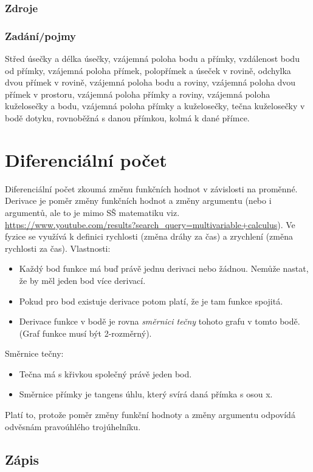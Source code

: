 \documentclass[12pt]{article}
\begin{document}
\subsubsection{Zdroje}
\subsubsection{Zadání/pojmy}
Střed úsečky a délka úsečky, vzájemná poloha bodu a přímky, vzdálenost bodu od přímky, vzájemná poloha přímek, polopřímek a úseček v rovině, odchylka dvou přímek v rovině, vzájemná poloha bodu a roviny, vzájemná poloha dvou přímek v prostoru, vzájemná poloha přímky a roviny, vzájemná poloha kuželosečky a bodu, vzájemná poloha přímky a kuželosečky, tečna kuželosečky v bodě dotyku, rovnoběžná s danou přímkou, kolmá k dané přímce.

\section{Diferenciální počet}
Diferenciální počet zkoumá změnu funkčních hodnot v závislosti na proměnné. Derivace je poměr změny funkčních hodnot a změny argumentu (nebo i argumentů, ale to je mimo SŠ matematiku viz. \url{https://www.youtube.com/results?search_query=multivariable+calculus}). Ve fyzice se využívá k definici rychlosti (změna dráhy za čas) a zrychlení (změna rychlosti za čas).
Vlastnosti:
\begin{itemize}
\item Každý bod funkce má buď právě jednu derivaci nebo žádnou. Nemůže nastat, že by měl jeden bod více derivací.
\item Pokud pro bod existuje derivace potom platí, že je tam funkce spojitá.
\item Derivace funkce v bodě je rovna \emph{směrnici tečny} tohoto grafu v tomto bodě. (Graf funkce musí být 2-rozměrný).
\end{itemize}
Směrnice tečny:
\begin{itemize}
\item Tečna má s křivkou společný právě jeden bod.
\item Směrnice přímky je tangens úhlu, který svírá daná přímka s osou x.
\end{itemize}
Platí to, protože poměr změny funkční hodnoty a změny argumentu odpovídá odvěsnám pravoúhlého trojúhelníku.
\subsection{Zápis}
\end{document}
